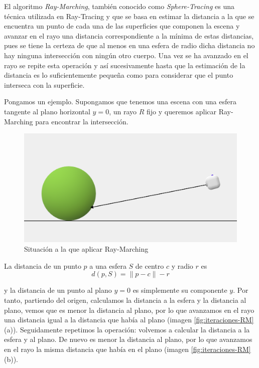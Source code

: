 El algoritmo \textit{Ray-Marching}, también conocido como \textit{Sphere-Tracing} es una técnica utilizada en Ray-Tracing y que se basa en estimar la distancia a la que se encuentra un punto de cada una de las superficies que componen la escena y avanzar en el rayo una distancia correspondiente a la mínima de estas distancias, pues se tiene la certeza de que al menos en una esfera de radio dicha distancia no hay ninguna intersección con ningún otro cuerpo. Una vez se ha avanzado en el rayo se repite esta operación y así sucesivamente hasta que la estimación de la distancia es lo suficientemente pequeña como para considerar que el punto interseca con la superficie.

Pongamos un ejemplo. Supongamos que tenemos una escena con una esfera tangente al plano horizontal $y=0$, un rayo $R$ fijo y queremos aplicar Ray-Marching para encontrar la intersección.

\begin{figure} [ht]
    \centering
    \includegraphics[scale = 0.2]{img/C8/situacion-inicial.png}
    \caption{Situación a la que aplicar Ray-Marching}
    \label{fig:RM-inicial}
\end{figure}

La distancia de un punto $p$ a una esfera $S$ de centro $c$ y radio $r$ es 
\begin{equation}
    \label{eq:distancia-punto-esfera}
    d(p,S) = \|p-c\| - r 
\end{equation}

y la distancia de un punto al plano $y=0$ es simplemente su componente $y$. Por tanto, partiendo del origen, calculamos la distancia a la esfera y la distancia al plano, vemos que es menor la distancia al plano, por lo que avanzamos en el rayo una distancia igual a la distancia que había al plano (imagen \ref{fig:iteraciones-RM} (a)). Seguidamente repetimos la operación: volvemos a calcular la distancia a la esfera y al plano. De nuevo es menor la distancia al plano, por lo que avanzamos en el rayo la misma distancia que había en el plano (imagen \ref{fig:iteraciones-RM} (b)).

